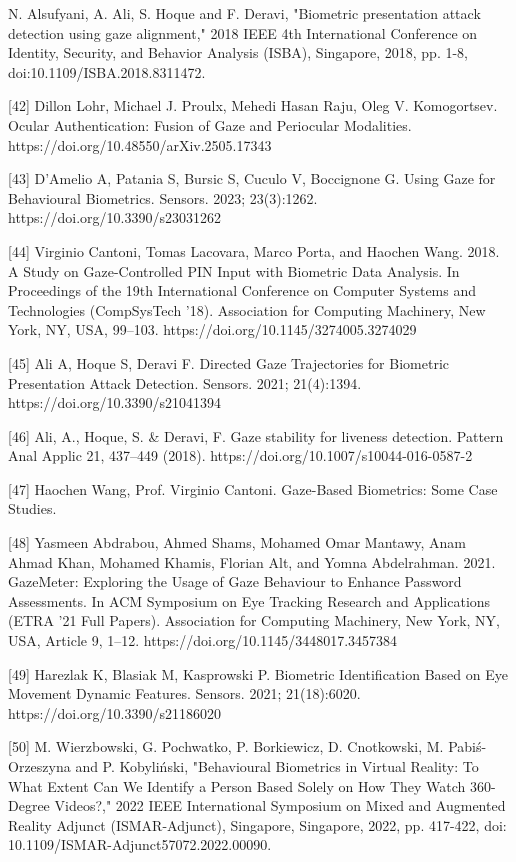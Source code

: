 \documentclass{article}
\begin{document}
\begin{raggedright}
[41] N. Alsufyani, A. Ali, S. Hoque and F. Deravi, "Biometric presentation attack detection using gaze alignment," 2018 IEEE 4th International Conference on Identity, Security, and Behavior Analysis (ISBA), Singapore, 2018, pp. 1-8, doi:10.1109/ISBA.2018.8311472.

[42] Dillon Lohr, Michael J. Proulx, Mehedi Hasan Raju, Oleg V. Komogortsev. Ocular Authentication: Fusion of Gaze and Periocular Modalities.  https://doi.org/10.48550/arXiv.2505.17343

[43] D'Amelio A, Patania S, Bursic S, Cuculo V, Boccignone G. Using Gaze for Behavioural Biometrics. Sensors. 2023; 23(3):1262. https://doi.org/10.3390/s23031262

[44] Virginio Cantoni, Tomas Lacovara, Marco Porta, and Haochen Wang. 2018. A Study on Gaze-Controlled PIN Input with Biometric Data Analysis. In Proceedings of the 19th International Conference on Computer Systems and Technologies (CompSysTech '18). Association for Computing Machinery, New York, NY, USA, 99–103. https://doi.org/10.1145/3274005.3274029

[45] Ali A, Hoque S, Deravi F. Directed Gaze Trajectories for Biometric Presentation Attack Detection. Sensors. 2021; 21(4):1394. https://doi.org/10.3390/s21041394

[46] Ali, A., Hoque, S. \& Deravi, F. Gaze stability for liveness detection. Pattern Anal Applic 21, 437–449 (2018). https://doi.org/10.1007/s10044-016-0587-2

[47] Haochen Wang, Prof. Virginio Cantoni. Gaze-Based Biometrics: Some Case Studies. 

[48] Yasmeen Abdrabou, Ahmed Shams, Mohamed Omar Mantawy, Anam Ahmad Khan, Mohamed Khamis, Florian Alt, and Yomna Abdelrahman. 2021. GazeMeter: Exploring the Usage of Gaze Behaviour to Enhance Password Assessments. In ACM Symposium on Eye Tracking Research and Applications (ETRA '21 Full Papers). Association for Computing Machinery, New York, NY, USA, Article 9, 1–12. https://doi.org/10.1145/3448017.3457384

[49] Harezlak K, Blasiak M, Kasprowski P. Biometric Identification Based on Eye Movement Dynamic Features. Sensors. 2021; 21(18):6020. https://doi.org/10.3390/s21186020

[50] M. Wierzbowski, G. Pochwatko, P. Borkiewicz, D. Cnotkowski, M. Pabiś-Orzeszyna and P. Kobyliński, "Behavioural Biometrics in Virtual Reality: To What Extent Can We Identify a Person Based Solely on How They Watch 360-Degree Videos?," 2022 IEEE International Symposium on Mixed and Augmented Reality Adjunct (ISMAR-Adjunct), Singapore, Singapore, 2022, pp. 417-422, doi: 10.1109/ISMAR-Adjunct57072.2022.00090.


\end{raggedright}
\end{document}
